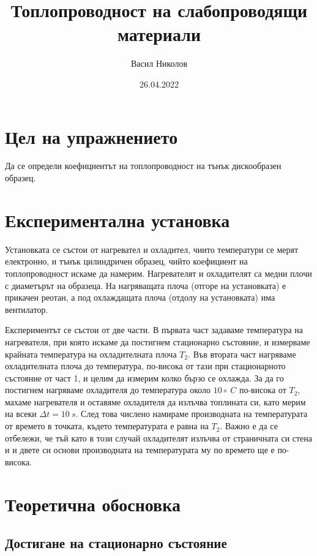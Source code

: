 \documentclass[reprint,amsmath,amssymb,aps]{revtex4-2}
\begin{document}
\setlength{\abovedisplayskip}{3pt}
\setlength{\belowdisplayskip}{3pt}    

\title{Топлопроводност на слабопроводящи материали}

\author{Васил Николов}
\date{26.04.2022}
\maketitle


\section{Цел на упражнението}

Да се определи коефициентът на топлопроводност на тънък дискообразен образец. 


\section{Експериментална установка}

Установката се състои от нагревател и охладител, чиито температури се мерят електронно, и тънък цилиндричен образец, чийто коефициент на топлопроводност искаме да намерим. Нагревателят и охладителят са медни плочи с диаметърът на образеца. На нагряващата плоча (отгоре на установката) е прикачен реотан, а под охлаждащата плоча (отдолу на установката) има вентилатор. 

Експериментът се състои от две части. В първата част задаваме температура на нагревателя, при която искаме да постигнем стационарно състояние, и измерваме крайната температура на охладителната плоча $T_2$. Във втората част нагряваме охладителната плоча до температура, по-висока от тази при стационарното състояние от част 1, и целим да измерим колко бързо се охлажда. За да го постигнем нагряваме охладителя до температура около $10\circ \ C$ по-висока от $T_2$, махаме нагревателя и оставяме охладителя да излъчва топлината си, като мерим на всеки $\Delta t = 10 \ \si{s}$. След това числено намираме производната на температурата от времето в точката, където температурата е равна на $T_2$. Важно е да се отбележи, че тъй като в този случай охладителят излъчва от страничната си стена и и двете си основи производната на температурата му по времето ще е по-висока. 


\section{Теоретична обосновка}
\subsection{Достигане на стационарно състояние}
\end{document}
